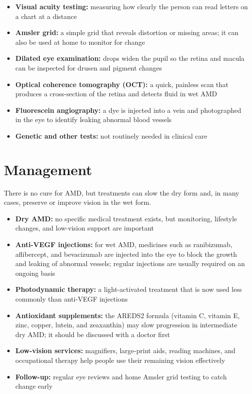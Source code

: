 \begin{itemize}
    \item \textbf{Visual acuity testing:} measuring how clearly the person can read letters on a chart at a distance
    \item \textbf{Amsler grid:} a simple grid that reveals distortion or missing areas; it can also be used at home to monitor for change
    \item \textbf{Dilated eye examination:} drops widen the pupil so the retina and macula can be inspected for drusen and pigment changes
    \item \textbf{Optical coherence tomography (OCT):} a quick, painless scan that produces a cross-section of the retina and detects fluid in wet AMD
    \item \textbf{Fluorescein angiography:} a dye is injected into a vein and photographed in the eye to identify leaking abnormal blood vessels
    \item \textbf{Genetic and other tests:} not routinely needed in clinical care
\end{itemize}

\section*{Management}
There is no cure for AMD, but treatments can slow the dry form and, in many cases, preserve or improve vision in the wet form.

\begin{itemize}
    \item \textbf{Dry AMD:} no specific medical treatment exists, but monitoring, lifestyle changes, and low-vision support are important
    \item \textbf{Anti-VEGF injections:} for wet AMD, medicines such as ranibizumab, aflibercept, and bevacizumab are injected into the eye to block the growth and leaking of abnormal vessels; regular injections are usually required on an ongoing basis
    \item \textbf{Photodynamic therapy:} a light-activated treatment that is now used less commonly than anti-VEGF injections
    \item \textbf{Antioxidant supplements:} the AREDS2 formula (vitamin C, vitamin E, zinc, copper, lutein, and zeaxanthin) may slow progression in intermediate dry AMD; it should be discussed with a doctor first
    \item \textbf{Low-vision services:} magnifiers, large-print aids, reading machines, and occupational therapy help people use their remaining vision effectively
    \item \textbf{Follow-up:} regular eye reviews and home Amsler grid testing to catch change early
\end{itemize}

